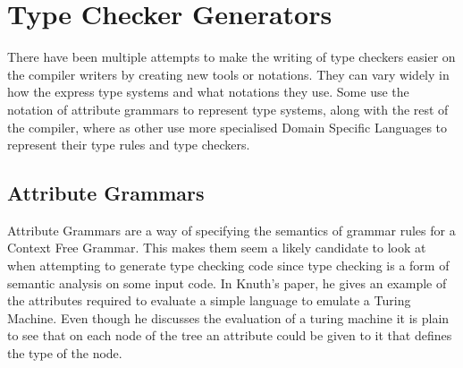 \section{Type Checker Generators}
There have been multiple attempts to make the writing of type checkers easier on the compiler writers by creating new tools or notations.
They can vary widely in how the express type systems and what notations they use.
Some use the notation of attribute grammars to represent type systems, along with the rest of the compiler, where as other use more specialised Domain Specific Languages to represent their type rules and type checkers.

\subsection{Attribute Grammars}
Attribute Grammars are a way of specifying the semantics of grammar rules for a Context Free Grammar.
This makes them seem a likely candidate to look at when attempting to generate type checking code since type checking is a form of semantic analysis on some input code.
In Knuth's paper\cite{Knuth1968}, he gives an example of the attributes required to evaluate a simple language to emulate a Turing Machine.
Even though he discusses the evaluation of a turing machine it is plain to see that on each node of the tree an attribute could be given to it that defines the type of the node.

